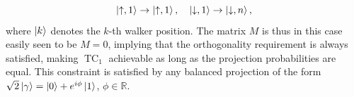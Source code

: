 \documentclass[
	aps, pra,
	superscriptaddress, twocolumn,
	floatfix,
	10pt
]{revtex4-1}
\newcommand{\on}[1]{\operatorname{#1}}
\newcommand{\RR}{\mathbb{R}}
\newcommand{\commale}[1]{{\textcolor{red} {\it{[Note (Ale): #1]}}}}
\begin{document}
\begin{equation}
    \ket{\uparrow,1} \to \ket{\uparrow, 1}, \quad
    \ket{\downarrow,1} \to \ket{\downarrow, n},
\end{equation}
where $\ket k$ denotes the $k$-th walker position.
The matrix $M$ is thus in this case easily seen to be $M=0$, implying that the orthogonality requirement is always satisfied, making $\on{TC}_1$ achievable as long as the projection probabilities are equal. This constraint is satisfied by any balanced projection of the form $\sqrt2\ket\gamma=\ket0+e^{i\phi}\ket1$, $\phi\in\RR$.

\end{document}
